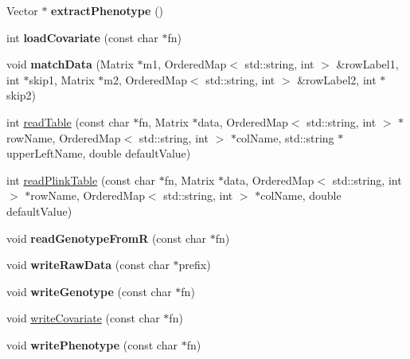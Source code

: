 \begin{DoxyCompactItemize}
\item 
\hypertarget{classVCFData_a371f90cce2469e56d147486893fdb97e}{Vector $\ast$ {\bfseries extract\-Phenotype} ()}\label{classVCFData_a371f90cce2469e56d147486893fdb97e}

\item 
\hypertarget{classVCFData_ad2c2f810ee6ff936b62f27363921f779}{int {\bfseries load\-Covariate} (const char $\ast$fn)}\label{classVCFData_ad2c2f810ee6ff936b62f27363921f779}

\item 
\hypertarget{classVCFData_aa0fb190cf49d8699602b0165fc234f32}{void {\bfseries match\-Data} (Matrix $\ast$m1, Ordered\-Map$<$ std\-::string, int $>$ \&row\-Label1, int $\ast$skip1, Matrix $\ast$m2, Ordered\-Map$<$ std\-::string, int $>$ \&row\-Label2, int $\ast$skip2)}\label{classVCFData_aa0fb190cf49d8699602b0165fc234f32}

\item 
int \hyperlink{classVCFData_abad5d2e38d231e53fb2d4131740f9e8c}{read\-Table} (const char $\ast$fn, Matrix $\ast$data, Ordered\-Map$<$ std\-::string, int $>$ $\ast$row\-Name, Ordered\-Map$<$ std\-::string, int $>$ $\ast$col\-Name, std\-::string $\ast$upper\-Left\-Name, double default\-Value)
\item 
int \hyperlink{classVCFData_a833405588404513e5404a6a79594f3fe}{read\-Plink\-Table} (const char $\ast$fn, Matrix $\ast$data, Ordered\-Map$<$ std\-::string, int $>$ $\ast$row\-Name, Ordered\-Map$<$ std\-::string, int $>$ $\ast$col\-Name, double default\-Value)
\item 
\hypertarget{classVCFData_a7d1f8f57af22b098cf3b0eeb96e72819}{void {\bfseries read\-Genotype\-From\-R} (const char $\ast$fn)}\label{classVCFData_a7d1f8f57af22b098cf3b0eeb96e72819}

\item 
\hypertarget{classVCFData_ad72d49dcbca45f6a000c8b36183737b3}{void {\bfseries write\-Raw\-Data} (const char $\ast$prefix)}\label{classVCFData_ad72d49dcbca45f6a000c8b36183737b3}

\item 
\hypertarget{classVCFData_ab1687e350234379a42e607b5aa9006a8}{void {\bfseries write\-Genotype} (const char $\ast$fn)}\label{classVCFData_ab1687e350234379a42e607b5aa9006a8}

\item 
void \hyperlink{classVCFData_a7f38fd776722b474270ebd21f9088131}{write\-Covariate} (const char $\ast$fn)
\item 
\hypertarget{classVCFData_a6915ffdb20757ed622a79f3496ebecc0}{void {\bfseries write\-Phenotype} (const char $\ast$fn)}\label{classVCFData_a6915ffdb20757ed622a79f3496ebecc0}


\end{DoxyCompactItemize}
